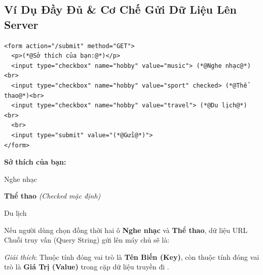 \subsection{Ví Dụ Đầy Đủ \& Cơ Chế Gửi Dữ Liệu Lên Server}

\begin{codeWindow}
\begin{lstlisting}[language=HTML5]
<form action="/submit" method="GET">
  <p>(*@Sở thích của bạn:@*)</p>
  <input type="checkbox" name="hobby" value="music"> (*@Nghe nhạc@*)<br>
  <input type="checkbox" name="hobby" value="sport" checked> (*@Thể thao@*)<br>
  <input type="checkbox" name="hobby" value="travel"> (*@Du lịch@*)<br>
  <br>
  <input type="submit" value="(*@Gửi@*)">
</form>
\end{lstlisting}
\end{codeWindow}

\begin{browserWindow}
\sffamily\small
\textbf{Sở thích của bạn:} \\[5pt]
 \; Nghe nhạc \\[4pt]
 \; \textbf{Thể thao} \quad \textcolor{codeComment}{\small\textit{(Checked mặc định)}} \\[4pt]
 \; Du lịch \\[8pt]
\end{browserWindow}

\begin{tipBox}
Nếu người dùng chọn đồng thời hai ô \textbf{Nghe nhạc} và \textbf{Thể thao}, dữ liệu URL Chuỗi truy vấn (Query String) gửi lên máy chủ sẽ là:
\begin{center}
\end{center}
\textit{Giải thích}: Thuộc tính  đóng vai trò là \textbf{Tên Biến (Key)}, còn thuộc tính  đóng vai trò là \textbf{Giá Trị (Value)} trong cặp dữ liệu truyền đi .
\end{tipBox}

